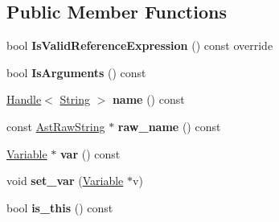 \subsection*{Public Member Functions}
\begin{DoxyCompactItemize}
\item 
bool {\bfseries Is\+Valid\+Reference\+Expression} () const  override\hypertarget{classv8_1_1internal_1_1_variable_proxy_a4148b2f4e19b0f9b13e1b0e04ae8b981}{}\label{classv8_1_1internal_1_1_variable_proxy_a4148b2f4e19b0f9b13e1b0e04ae8b981}

\item 
bool {\bfseries Is\+Arguments} () const \hypertarget{classv8_1_1internal_1_1_variable_proxy_a9ba32de9b607818e61aee8dbb36dfd16}{}\label{classv8_1_1internal_1_1_variable_proxy_a9ba32de9b607818e61aee8dbb36dfd16}

\item 
\hyperlink{classv8_1_1internal_1_1_handle}{Handle}$<$ \hyperlink{classv8_1_1internal_1_1_string}{String} $>$ {\bfseries name} () const \hypertarget{classv8_1_1internal_1_1_variable_proxy_a0b0ca38fce6d8bce8287970843ed54cf}{}\label{classv8_1_1internal_1_1_variable_proxy_a0b0ca38fce6d8bce8287970843ed54cf}

\item 
const \hyperlink{classv8_1_1internal_1_1_ast_raw_string}{Ast\+Raw\+String} $\ast$ {\bfseries raw\+\_\+name} () const \hypertarget{classv8_1_1internal_1_1_variable_proxy_a8eba6b01780fbdf8bc5f2c2559084cdd}{}\label{classv8_1_1internal_1_1_variable_proxy_a8eba6b01780fbdf8bc5f2c2559084cdd}

\item 
\hyperlink{classv8_1_1internal_1_1_variable}{Variable} $\ast$ {\bfseries var} () const \hypertarget{classv8_1_1internal_1_1_variable_proxy_a9e1034dcd72dec421a4c23600a32c521}{}\label{classv8_1_1internal_1_1_variable_proxy_a9e1034dcd72dec421a4c23600a32c521}

\item 
void {\bfseries set\+\_\+var} (\hyperlink{classv8_1_1internal_1_1_variable}{Variable} $\ast$v)\hypertarget{classv8_1_1internal_1_1_variable_proxy_ac8cb651fb9705a200f0d453d1c557ff7}{}\label{classv8_1_1internal_1_1_variable_proxy_ac8cb651fb9705a200f0d453d1c557ff7}

\item 
bool {\bfseries is\+\_\+this} () const \hypertarget{classv8_1_1internal_1_1_variable_proxy_a8d47683038b7d72986c5464241effe33}{}\label{classv8_1_1internal_1_1_variable_proxy_a8d47683038b7d72986c5464241effe33}


\end{DoxyCompactItemize}
